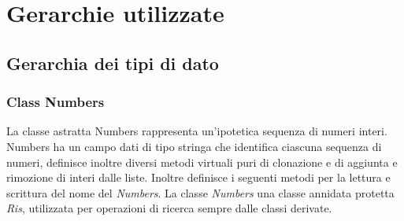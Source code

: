 \documentclass[a4paper,10pt]{article}
\begin{document}
        \section{Gerarchie utilizzate}
        \subsection{Gerarchia dei tipi di dato}
        \subsubsection{Class Numbers}
        La classe astratta Numbers rappresenta un’ipotetica sequenza di numeri interi. Numbers ha un campo dati di tipo stringa che identifica ciascuna sequenza di numeri, definisce inoltre diversi metodi virtuali puri di clonazione e di aggiunta e rimozione di interi dalle liste.
        Inoltre definisce i seguenti metodi per la lettura e scrittura del nome del \textit{Numbers}.
        La classe \textit{Numbers} una classe annidata protetta \textit{Ris}, utilizzata per operazioni di ricerca sempre dalle classi derivate.
        
\end{document}
